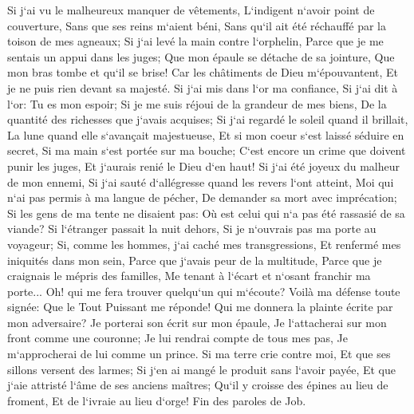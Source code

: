 \verse Si j`ai vu le malheureux manquer de vêtements, L`indigent n`avoir point de couverture, 
\verse Sans que ses reins m`aient béni, Sans qu`il ait été réchauffé par la toison de mes agneaux; 
\verse Si j`ai levé la main contre l`orphelin, Parce que je me sentais un appui dans les juges; 
\verse Que mon épaule se détache de sa jointure, Que mon bras tombe et qu`il se brise! 
\verse Car les châtiments de Dieu m`épouvantent, Et je ne puis rien devant sa majesté. 
\verse Si j`ai mis dans l`or ma confiance, Si j`ai dit à l`or: Tu es mon espoir; 
\verse Si je me suis réjoui de la grandeur de mes biens, De la quantité des richesses que j`avais acquises; 
\verse Si j`ai regardé le soleil quand il brillait, La lune quand elle s`avançait majestueuse, 
\verse Et si mon coeur s`est laissé séduire en secret, Si ma main s`est portée sur ma bouche; 
\verse C`est encore un crime que doivent punir les juges, Et j`aurais renié le Dieu d`en haut! 
\verse Si j`ai été joyeux du malheur de mon ennemi, Si j`ai sauté d`allégresse quand les revers l`ont atteint, 
\verse Moi qui n`ai pas permis à ma langue de pécher, De demander sa mort avec imprécation; 
\verse Si les gens de ma tente ne disaient pas: Où est celui qui n`a pas été rassasié de sa viande? 
\verse Si l`étranger passait la nuit dehors, Si je n`ouvrais pas ma porte au voyageur; 
\verse Si, comme les hommes, j`ai caché mes transgressions, Et renfermé mes iniquités dans mon sein, 
\verse Parce que j`avais peur de la multitude, Parce que je craignais le mépris des familles, Me tenant à l`écart et n`osant franchir ma porte... 
\verse Oh! qui me fera trouver quelqu`un qui m`écoute? Voilà ma défense toute signée: Que le Tout Puissant me réponde! Qui me donnera la plainte écrite par mon adversaire? 
\verse Je porterai son écrit sur mon épaule, Je l`attacherai sur mon front comme une couronne; 
\verse Je lui rendrai compte de tous mes pas, Je m`approcherai de lui comme un prince. 
\verse Si ma terre crie contre moi, Et que ses sillons versent des larmes; 
\verse Si j`en ai mangé le produit sans l`avoir payée, Et que j`aie attristé l`âme de ses anciens maîtres; 
\verse Qu`il y croisse des épines au lieu de froment, Et de l`ivraie au lieu d`orge! Fin des paroles de Job. 

